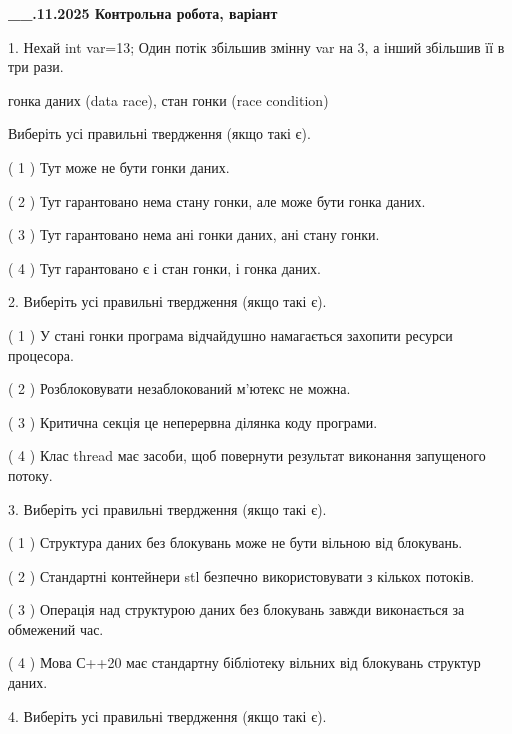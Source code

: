 \documentclass[12pt, ukrainian]{article}
\begin{document}
\newpage
\begin {large}

\textbf{\_\_.11.2025 Контрольна робота, варіант  }\par


{
1. Нехай int var=13; Один потік збільшив змінну var на 3, а інший збільшив її в три рази.

гонка даних (data race), стан гонки (race condition)

Виберіть усі правильні твердження (якщо такі є).\par
\vspace{2mm}
( 1 ) Тут може не бути гонки даних.%

( 2 ) Тут гарантовано нема стану гонки, але може бути гонка даних.%

( 3 ) Тут гарантовано нема ані гонки даних, ані стану гонки.%

( 4 ) Тут гарантовано є і стан гонки, і гонка даних.%


2. Виберіть усі правильні твердження (якщо такі є).\par
\vspace{2mm}

( 1 ) У стані гонки програма відчайдушно намагається захопити ресурси процесора.%

( 2 ) Розблоковувати незаблокований м’ютекс не можна.%

( 3 ) Критична секція це неперервна ділянка коду програми.%

( 4 ) Клас thread має засоби, щоб повернути результат виконання запущеного потоку.%


3. Виберіть усі правильні твердження (якщо такі є).\par
\vspace{2mm}

( 1 ) Структура даних без блокувань може не бути вільною від блокувань.%

( 2 ) Стандартні контейнери stl безпечно використовувати з кількох потоків.%

( 3 ) Операція над структурою даних без блокувань завжди виконається за обмежений час.%

( 4 ) Мова С++20 має стандартну бібліотеку вільних від блокувань структур даних.%


4. Виберіть усі правильні твердження (якщо такі є).\par
\vspace{2mm}

}
\end{large}
\end{document}
